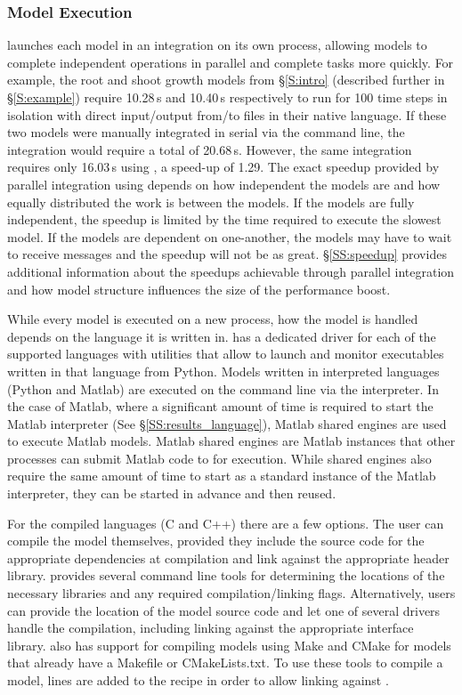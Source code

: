 \documentclass[journal]{IEEEtran}
\newcommand{\todo}[1]{{\color{red}{#1}}}
\newcommand{\pkg}{{\tt \todo{cis\_interface}}{}}
\begin{document}
\subsubsection{Model Execution}\label{SS:model_execution}
%
{\pkg} launches each model in an integration on its own process, allowing models to complete independent operations in parallel and complete tasks more quickly. For example, the root and shoot growth models from \S\ref{S:intro} (described further in \S\ref{S:example}) require 10.28\,s and 10.40\,s respectively to run for 100 time steps in isolation with direct input/output from/to files in their native language. If these two models were manually integrated in serial via the command line, the integration would require a total of 20.68\,s. However, the same integration requires only 16.03\,s using {\pkg}, a speed-up of 1.29. The exact speedup provided by parallel integration using {\pkg} depends on how independent the models are and how equally distributed the work is between the models. If the models are fully independent, the speedup is limited by the time required to execute the slowest model. If the models are dependent on one-another, the models may have to wait to receive messages and the speedup will not be as great. \S\ref{SS:speedup} provides additional information about the speedups achievable through {\pkg} parallel integration and how model structure influences the size of the performance boost.

While every model is executed on a new process, how the model is handled depends on the language it is written in. {\pkg} has a dedicated driver for each of the supported languages with utilities that allow {\pkg} to launch and monitor executables written in that language from Python. Models written in interpreted languages (Python and Matlab) are executed on the command line via the interpreter. In the case of Matlab, where a significant amount of time is required to start the Matlab interpreter (See \S\ref{SS:results_language}), Matlab shared engines are used to execute Matlab models. Matlab shared engines are Matlab instances that other processes can submit Matlab code to for execution. While shared engines also require the same amount of time to start as a standard instance of the Matlab interpreter, they can be started in advance and then reused.

For the compiled languages (C and C++) there are a few options. The user can compile the model themselves, provided they include the source code for the appropriate dependencies at compilation and link against the appropriate {\pkg} header library. {\pkg} provides several command line tools for determining the locations of the necessary libraries and any required compilation/linking flags. Alternatively, users can provide the location of the model source code and let one of several {\pkg} drivers handle the compilation, including linking against the appropriate {\pkg} interface library. {\pkg} also has support for compiling models using Make \citep{Stallman2004} and CMake \citep{Martin2006} for models that already have a Makefile or CMakeLists.txt. To use these tools to compile a model, lines are added to the recipe in order to allow linking against {\pkg}.
\end{document}
